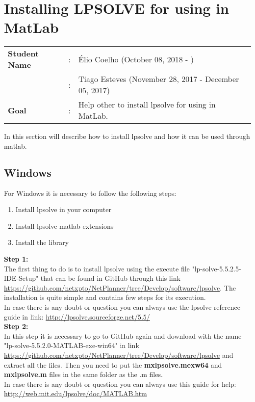 \clearpage

\section{Installing LPSOLVE for using in MatLab}
\begin{tcolorbox}	
\begin{tabular}{p{2.75cm} p{0.2cm} p{10.5cm}} 	
\textbf{Student Name}  &:& \'Elio Coelho        (October 08, 2018 - )\\
						      &:& Tiago Esteves        (November 28, 2017 - December 05, 2017)\\
\textbf{Goal}          &:& Help other to install lpsolve for using in MatLab.
\end{tabular}
\end{tcolorbox}

\vspace{11pt}
In this section will describe how to install lpsolve and how it can be used through matlab. \\

\subsection{Windows}\label{Windows}

\vspace{11pt}
For Windows it is necessary to follow the following steps:

\begin{enumerate}
	\item Install lpsolve in your computer
	\item Install lpsolve matlab extensions
	\item Install the library
\end{enumerate}

\textbf{Step 1:}\\
The first thing to do is to install lpsolve using the execute file "lp-solve-5.5.2.5-IDE-Setup" that can be found in GitHub through this link \url{https://github.com/netxpto/NetPlanner/tree/Develop/software/lpsolve}. The installation is quite simple and contains few steps for its execution. \\
In case there is any doubt or question you can always use the lpsolve reference guide in link: \url{http://lpsolve.sourceforge.net/5.5/} \\

\textbf{Step 2:}\\
In this step it is necessary to go to GitHub again and download with the name "lp-solve-5.5.2.0-MATLAB-exe-win64" in link \url{https://github.com/netxpto/NetPlanner/tree/Develop/software/lpsolve} and extract all the files. Then you need to put the \textbf{mxlpsolve.mexw64} and \textbf{mxlpsolve.m} files in the same folder as the .m files. \\
In case there is any doubt or question you can always use this guide for help: \url{http://web.mit.edu/lpsolve/doc/MATLAB.htm} \\

